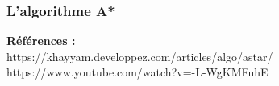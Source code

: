     

\subsubsection{L'algorithme A*}







\newpage
\renewcommand{\contentsname}{Plan du cours}
\tableofcontents




\vfill
\textbf{Références :}\\
https://khayyam.developpez.com/articles/algo/astar/\\
https://www.youtube.com/watch?v=-L-WgKMFuhE




